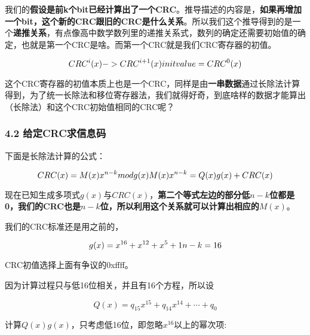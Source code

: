 \documentclass[
]{article}
\begin{document}
我们的\textbf{假设是前k个bit已经计算出了一个CRC}。推导描述的内容是，\textbf{如果再增加一个bit，这个新的CRC跟旧的CRC是什么关系}。所以我们这个推导得到的是一个\textbf{递推关系}，有点像高中数学数列里的递推关系式，数列的确定还需要初始值的确定，也就是第一个CRC是啥。而第一个CRC就是我们CRC寄存器的初值。

$$
CRC^i(x) \space -> \space CRC^{i+1}(x)\\
init \space value =CRC^0(x)
$$

这个CRC寄存器的初值本质上也是一个CRC，同样是由\textbf{一串数据}通过长除法计算得到，为了统一长除法和移位寄存器法，我们就得好奇，到底啥样的数据才能算出（长除法）和这个CRC初始值相同的CRC呢？

\hypertarget{header-n200}{%
\subsubsection{4.2 给定CRC求信息码}\label{header-n200}}

下面是长除法计算的公式：

$$
CRC(x)=M(x)x^{n-k} \space mod \space g(x)\\
M(x)x^{n-k}=Q(x)g(x)+CRC(x)\\
$$

现在已知生成多项式$g(x)$与$CRC(x)$，\textbf{第二个等式左边的部分低$n-k$位都是0，我们的CRC也是$n-k$位，所以利用这个关系就可以计算出相应的$M(x)$}。


我们的CRC标准还是用之前的，

$$
g(x)=x^{16}+x^{12}+x^5+1\\
n-k=16
$$

CRC初值选择上面有争议的0xffff。

因为计算过程只与低16位相关，并且有16个方程，所以设

$$
Q(x)=q_{15}x^{15}+q_{14}x^{14}+\cdots+q_0
$$

计算$Q(x)g(x)$，只考虑低16位，即忽略$x^{16}以上的幂次项$:
\end{document}
